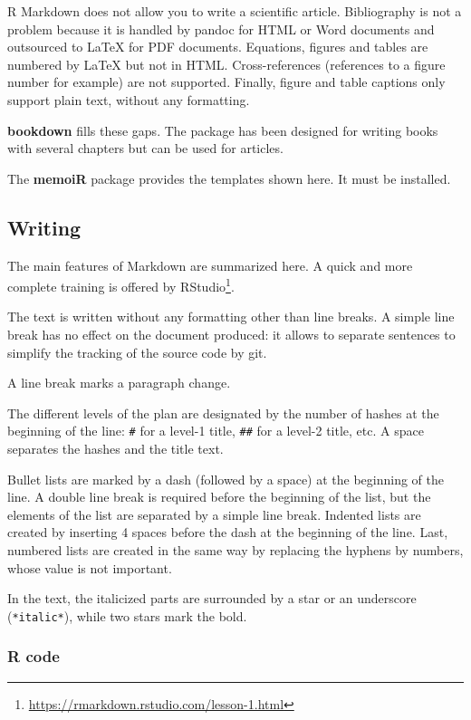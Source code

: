 \documentclass[
  12pt,
  american,
  a4paper,
  extrafontsizes,onecolumn,openright
  ]{memoir}
\begin{document}
R Markdown does not allow you to write a scientific article.
Bibliography is not a problem because it is handled by pandoc for HTML or Word documents and outsourced to LaTeX for PDF documents.
Equations, figures and tables are numbered by LaTeX but not in HTML.
Cross-references (references to a figure number for example) are not supported.
Finally, figure and table captions only support plain text, without any formatting.

\textbf{bookdown} fills these gaps.
The package has been designed for writing books with several chapters but can be used for articles.

The \textbf{memoiR} package provides the templates shown here.
It must be installed.

\hypertarget{writing}{%
\subsection{Writing}\label{writing}}

The main features of Markdown are summarized here.
A quick and more complete training is offered by RStudio\footnote{\url{https://rmarkdown.rstudio.com/lesson-1.html}}.

The text is written without any formatting other than line breaks.
A simple line break has no effect on the document produced: it allows to separate sentences to simplify the tracking of the source code by git.

A line break marks a paragraph change.

The different levels of the plan are designated by the number of hashes at the beginning of the line: \texttt{\#} for a level-1 title, \texttt{\#\#} for a level-2 title, etc.
A space separates the hashes and the title text.

Bullet lists are marked by a dash (followed by a space) at the beginning of the line.
A double line break is required before the beginning of the list, but the elements of the list are separated by a simple line break.
Indented lists are created by inserting 4 spaces before the dash at the beginning of the line.
Last, numbered lists are created in the same way by replacing the hyphens by numbers, whose value is not important.

In the text, the italicized parts are surrounded by a star or an underscore (\texttt{*italic*}), while two stars mark the bold.

\hypertarget{r-code}{%
\subsubsection{R code}\label{r-code}}
\end{document}
